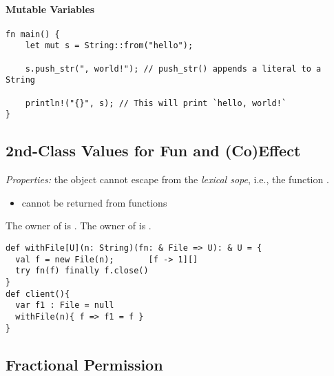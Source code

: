 \paragraph{Mutable Variables}
\begin{lstlisting}[basicstyle=\footnotesize\ttfamily]
fn main() {
    let mut s = String::from("hello");

    s.push_str(", world!"); // push_str() appends a literal to a String

    println!("{}", s); // This will print `hello, world!`
}

\end{lstlisting}
\subsection{2nd-Class Values for Fun and (Co)Effect}
\emph{Properties:} the object  cannot escape from the \emph{lexical sope}, i.e., the function . 
\begin{itemize}
\item {} cannot be returned from functions
\end{itemize}
The owner of  is . The owner of  is . 
\begin{lstlisting}[basicstyle=\footnotesize\ttfamily]
def withFile[U](n: String)(fn: & File => U): & U = {
  val f = new File(n);       [f -> 1][]
  try fn(f) finally f.close()
}
def client(){
  var f1 : File = null
  withFile(n){ f => f1 = f }
}
\end{lstlisting}
\subsection{Fractional Permission}
\cite{permission}



